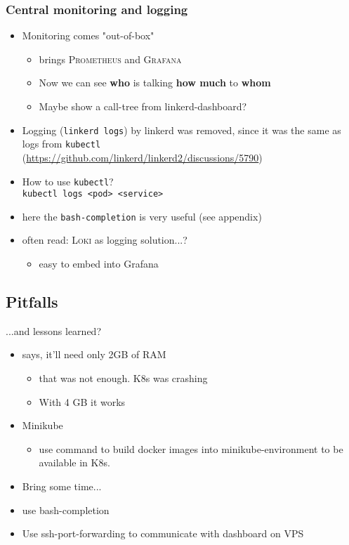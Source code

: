 \subsubsection{Central monitoring and logging}
\begin{itemize}
	\item Monitoring comes "out-of-box"
	\begin{itemize}
		\item \linkerd{} brings \textsc{Prometheus} and \textsc{Grafana}
		\item  Now we can see \textbf{who} is talking \textbf{how much} to \textbf{whom}
		\item Maybe show a call-tree from linkerd-dashboard?
	\end{itemize}

	\item Logging (\lstinline|linkerd logs|) by linkerd was removed, since it was the same as logs from \lstinline|kubectl|\\
	(\url{https://github.com/linkerd/linkerd2/discussions/5790})
	\item How to use \lstinline|kubectl|?\\
		\lstinline|kubectl logs <pod> <service>|
	\item here the \lstinline|bash-completion| is very useful (see appendix)
	\item often read: \textsc{Loki} as logging solution...?
	\begin{itemize}
		\item easy to embed into  Grafana
	\end{itemize}
\end{itemize}


\subsection{Pitfalls}
...and lessons learned?
\begin{itemize}
	\item \linkerd{} says, it'll need only 2GB of RAM 
	\begin{itemize}
		\item that was not enough. K8s was crashing
		\item With 4 GB it works
	\end{itemize}

	\item Minikube
	\begin{itemize}
		\item use command to build docker images into minikube-environment to be available in K8s.
	\end{itemize}

	\item Bring some time...
	\item use bash-completion
	\item Use ssh-port-forwarding to communicate with dashboard on VPS	
\end{itemize}


